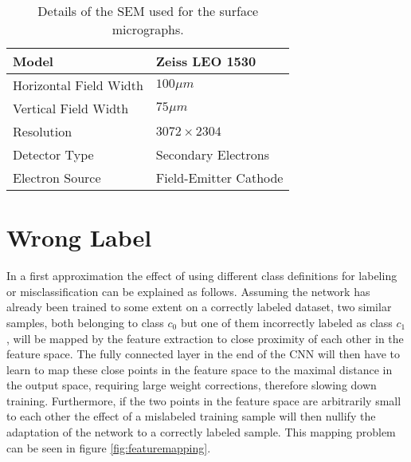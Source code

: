 \begin{table}[H]
 \begin{center}
  \begin{tabular}{@{} *2l @{}} \toprule[2pt]
   Model & Zeiss LEO 1530 \\\midrule
   Horizontal Field Width & $100\mu m$   \\ 
   Vertical Field Width  & $75\mu m$ \\ 
   Resolution  & $3072\times 2304$ \\
   Detector Type & Secondary Electrons \\
   Electron Source & Field-Emitter Cathode \\ \bottomrule[2pt]

  \end{tabular}
 \end{center}
 \caption{Details of the SEM used for the surface micrographs.}
   \label{tab:SEM}
\end{table}

\section{Wrong Label}

In a first approximation the effect of using different class definitions for labeling or misclassification can be explained as follows. Assuming the network has already been trained to some extent on a correctly labeled dataset, two similar samples, both belonging to class $c_0$ but one of them incorrectly labeled as class $c_1$, will be mapped by the feature extraction to close proximity of each other in the feature space. The fully connected layer in the end of the CNN will then have to learn to map these close points in the feature space to the maximal distance in the output space, requiring large weight corrections, therefore slowing down training. Furthermore, if the two points in the feature space are arbitrarily small to each other the effect of a mislabeled training sample will then nullify the adaptation of the network to a correctly labeled sample. This mapping problem can be seen in figure \ref{fig:featuremapping}.

